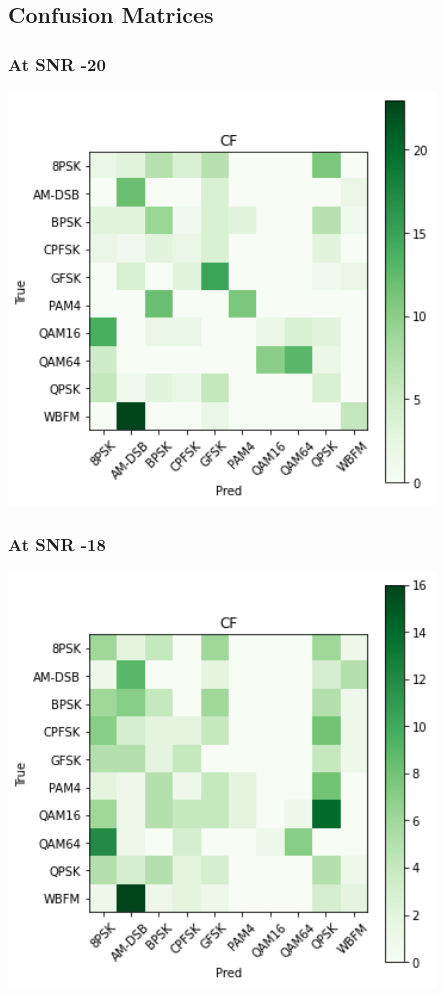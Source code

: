 \documentclass[12pt,a4paper]{article}
\begin{document}
        \subsection{Confusion Matrices}
        
\subsubsection{At SNR -20}
\begin{center}
\includegraphics[width=320pt]{imgs/snrs/snr6.png}
\end{center}

\subsubsection{At SNR -18}
\begin{center}
\includegraphics[width=320pt]{imgs/snrs/snr4.png}
\end{center}
\end{document}

